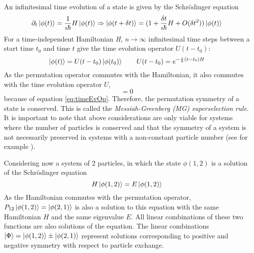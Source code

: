 An infinitesimal time evolution of a state is given by the Schrödinger equation
\begin{equation}
 \partial_{t}\ket{\phi(t)} = \frac{1}{\imath\hbar} H \ket{\phi(t)} \Rightarrow \ket{\phi(t+\delta t)} = (1 + \frac{\delta t}{ \imath\hbar} H + O(\delta t^{2}))\ket{\phi(t)}
\end{equation} 
For a time-independent Hamiltonian \textit{H}, \textit{n}$\rightarrow \infty$ infinitesimal time steps between a start time $t_{0}$ and time $t$ give the time evolution operator $U(t-t_{0})$:
\begin{equation}
\label{eq:timeEvOp}
 \ket{\phi(t)} = U(t-t_{0})\ket{\phi(t_{0})} \hspace{2em} U(t-t_{0}) = e^{-\frac{\imath}{\hbar}(t-t_{0})H}
\end{equation} 
As the permutation operator commutes with the Hamiltonian, it also commutes with the time evolution operator $U$,
\begin{equation}
 [P,U] = 0
\end{equation} 
because of equation \ref{eq:timeEvOp}. Therefore, the permutation symmetry of a state is conserved. This is called the \textit{Messiah-Greenberg (MG) superselection rule}. It is important to note that above considerations are only viable for systems where the number of particles is conserved and that the symmetry of a system is not necessarily preserved in systems with a non-constant particle number (see for example \cite{Messiah1964}). 

Considering now a system of 2 particles, in which the state $\phi(1,2)$ is a solution of the Schrödinger equation
\begin{equation}
 H \ket{\phi(1,2)} = E \ket{\phi(1,2)}
\end{equation} 
As the Hamiltonian commutes with the permutation operator, $P_{12} \ket{\phi(1,2)} = \ket{\phi(2,1)}$ is also a solution to this equation with the same Hamiltonian $H$ and the same eigenvalue $E$. All linear combinations of these two functions are also solutions of the equation. The linear combinations $\ket{\Phi} = \ket{\phi(1,2)} \pm \ket{\phi(2,1)}$ represent solutions corresponding to positive and negative symmetry with respect to particle exchange. 

